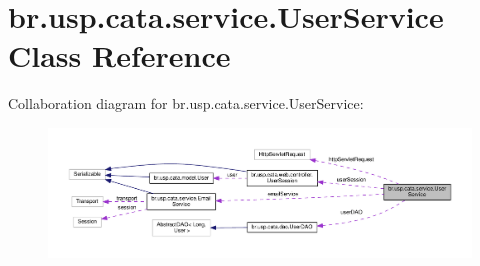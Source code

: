 \hypertarget{classbr_1_1usp_1_1cata_1_1service_1_1_user_service}{\section{br.\+usp.\+cata.\+service.\+User\+Service Class Reference}
\label{classbr_1_1usp_1_1cata_1_1service_1_1_user_service}
}


Collaboration diagram for br.\+usp.\+cata.\+service.\+User\+Service\+:\nopagebreak
\begin{figure}[H]
\begin{center}
\leavevmode
\includegraphics[width=350pt]{classbr_1_1usp_1_1cata_1_1service_1_1_user_service__coll__graph}
\end{center}
\end{figure}
